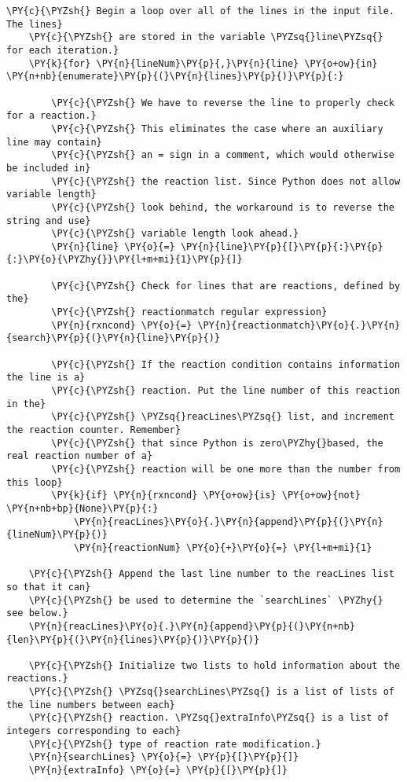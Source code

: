\begin{Verbatim}[commandchars=\\\{\}]
    \PY{c}{\PYZsh{} Begin a loop over all of the lines in the input file. The lines}
    \PY{c}{\PYZsh{} are stored in the variable \PYZsq{}line\PYZsq{} for each iteration.}
    \PY{k}{for} \PY{n}{lineNum}\PY{p}{,}\PY{n}{line} \PY{o+ow}{in} \PY{n+nb}{enumerate}\PY{p}{(}\PY{n}{lines}\PY{p}{)}\PY{p}{:}

        \PY{c}{\PYZsh{} We have to reverse the line to properly check for a reaction.}
        \PY{c}{\PYZsh{} This eliminates the case where an auxiliary line may contain}
        \PY{c}{\PYZsh{} an = sign in a comment, which would otherwise be included in}
        \PY{c}{\PYZsh{} the reaction list. Since Python does not allow variable length}
        \PY{c}{\PYZsh{} look behind, the workaround is to reverse the string and use}
        \PY{c}{\PYZsh{} variable length look ahead.}
        \PY{n}{line} \PY{o}{=} \PY{n}{line}\PY{p}{[}\PY{p}{:}\PY{p}{:}\PY{o}{\PYZhy{}}\PY{l+m+mi}{1}\PY{p}{]}

        \PY{c}{\PYZsh{} Check for lines that are reactions, defined by the}
        \PY{c}{\PYZsh{} reactionmatch regular expression}
        \PY{n}{rxncond} \PY{o}{=} \PY{n}{reactionmatch}\PY{o}{.}\PY{n}{search}\PY{p}{(}\PY{n}{line}\PY{p}{)}

        \PY{c}{\PYZsh{} If the reaction condition contains information the line is a}
        \PY{c}{\PYZsh{} reaction. Put the line number of this reaction in the}
        \PY{c}{\PYZsh{} \PYZsq{}reacLines\PYZsq{} list, and increment the reaction counter. Remember}
        \PY{c}{\PYZsh{} that since Python is zero\PYZhy{}based, the real reaction number of a}
        \PY{c}{\PYZsh{} reaction will be one more than the number from this loop}
        \PY{k}{if} \PY{n}{rxncond} \PY{o+ow}{is} \PY{o+ow}{not} \PY{n+nb+bp}{None}\PY{p}{:}
            \PY{n}{reacLines}\PY{o}{.}\PY{n}{append}\PY{p}{(}\PY{n}{lineNum}\PY{p}{)}
            \PY{n}{reactionNum} \PY{o}{+}\PY{o}{=} \PY{l+m+mi}{1}

    \PY{c}{\PYZsh{} Append the last line number to the reacLines list so that it can}
    \PY{c}{\PYZsh{} be used to determine the `searchLines` \PYZhy{} see below.}
    \PY{n}{reacLines}\PY{o}{.}\PY{n}{append}\PY{p}{(}\PY{n+nb}{len}\PY{p}{(}\PY{n}{lines}\PY{p}{)}\PY{p}{)}

    \PY{c}{\PYZsh{} Initialize two lists to hold information about the reactions.}
    \PY{c}{\PYZsh{} \PYZsq{}searchLines\PYZsq{} is a list of lists of the line numbers between each}
    \PY{c}{\PYZsh{} reaction. \PYZsq{}extraInfo\PYZsq{} is a list of integers corresponding to each}
    \PY{c}{\PYZsh{} type of reaction rate modification.}
    \PY{n}{searchLines} \PY{o}{=} \PY{p}{[}\PY{p}{]}
    \PY{n}{extraInfo} \PY{o}{=} \PY{p}{[}\PY{p}{]}


\end{Verbatim}
